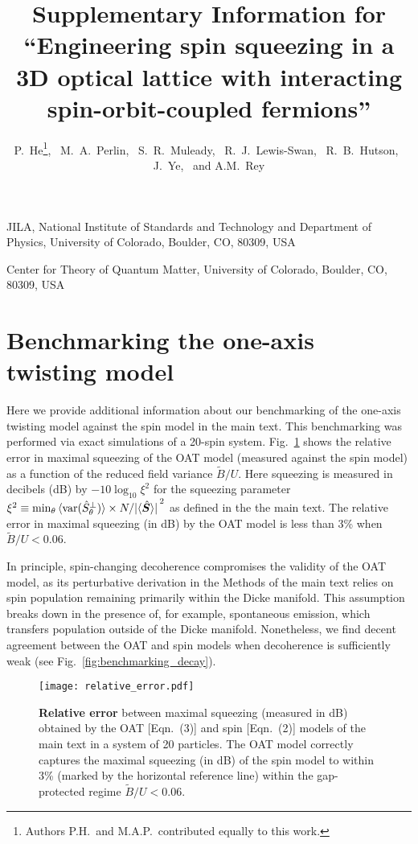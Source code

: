 \documentclass{nature}
\title{Supplementary Information for ``Engineering spin squeezing in a 3D optical lattice with interacting spin-orbit-coupled fermions''}
\author{
P.~He\both\footnote{Authors P.H.~and M.A.P.~contributed equally to this work.},~
M.~A.~Perlin\both\footnotemark[\value{footnote}],~
S.~R.~Muleady\both,~
R.~J.~Lewis-Swan\both,~
R.~B.~Hutson\JILA,~
J.~Ye\JILA,~
and A.M.~Rey\both
}
\renewcommand{\t}{\text} %
\renewcommand{\v}{\bm} %
\begin{document}
\maketitle

\begin{affiliations}
\item JILA, National Institute of Standards and Technology and Department of Physics, University of Colorado, Boulder, CO, 80309, USA
\label{JILA}
\item Center for Theory of Quantum Matter, University of Colorado, Boulder, CO, 80309, USA
\label{CTQM}
\end{affiliations}


\section*{Benchmarking the one-axis twisting model}

Here we provide additional information about our benchmarking of the one-axis twisting model against the spin model in the main text.
This benchmarking was performed via exact simulations of a 20-spin system.
Fig.~\ref{fig:relative_error} shows the relative error in maximal squeezing of the OAT model (measured against the spin model) as a function of the reduced field variance $\widetilde{B}/U$.
Here squeezing is measured in decibels (dB) by $-10\log_{10}\xi^2$ for the squeezing parameter $\xi^2\equiv\min_\theta\braket{\t{var}(\hat S^\perp_\theta)}\times N/\abs*{\braket{\hat{\v S}}}^2$ as defined in the the main text.
The relative error in maximal squeezing (in dB) by the OAT model is less than 3\% when $\widetilde{B}/U<0.06$.

In principle, spin-changing decoherence compromises the validity of the OAT model, as its perturbative derivation in the Methods of the main text relies on spin population remaining primarily within the Dicke manifold.
This assumption breaks down in the presence of, for example, spontaneous emission, which transfers population outside of the Dicke manifold.
Nonetheless, we find decent agreement between the OAT and spin models when decoherence is sufficiently weak (see Fig.~\ref{fig:benchmarking_decay}).

\begin{spacing}{1}
\begin{figure}
\centering
\texttt{[image: relative\_error.pdf]}
\caption{{\bf Relative error} between maximal squeezing (measured in dB) obtained by the OAT [Eqn.~(3)] and spin [Eqn.~(2)] models of the main text in a system of 20 particles.
The OAT model correctly captures the maximal squeezing (in dB) of the spin model to within 3\% (marked by the horizontal reference line) within the gap-protected regime $\widetilde{B}/U<0.06$.
}
\label{fig:relative_error}
\end{figure}
\end{spacing}
\end{document}
